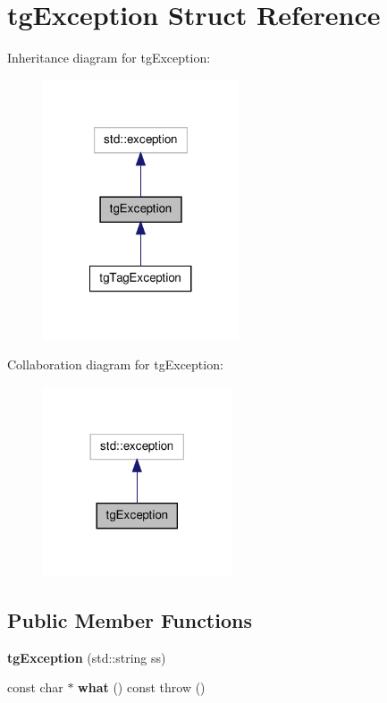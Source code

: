 \hypertarget{structtg_exception}{\section{tg\-Exception Struct Reference}
\label{structtg_exception}
}


Inheritance diagram for tg\-Exception\-:\nopagebreak
\begin{figure}[H]
\begin{center}
\leavevmode
\includegraphics[width=164pt]{structtg_exception__inherit__graph}
\end{center}
\end{figure}


Collaboration diagram for tg\-Exception\-:\nopagebreak
\begin{figure}[H]
\begin{center}
\leavevmode
\includegraphics[width=158pt]{structtg_exception__coll__graph}
\end{center}
\end{figure}
\subsection*{Public Member Functions}
\begin{DoxyCompactItemize}
\item 
\hypertarget{structtg_exception_a7441d34f34bfd789c0a980a8216096f0}{{\bfseries tg\-Exception} (std\-::string ss)}\label{structtg_exception_a7441d34f34bfd789c0a980a8216096f0}

\item 
\hypertarget{structtg_exception_a12edc2a009b7c96ea073e9d9c73f0ccd}{const char $\ast$ {\bfseries what} () const   throw ()}\label{structtg_exception_a12edc2a009b7c96ea073e9d9c73f0ccd}

\end{DoxyCompactItemize}
